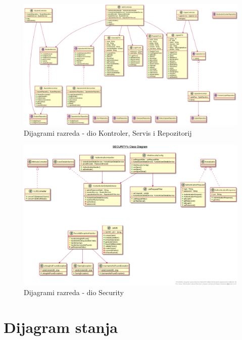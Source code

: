 			\begin{figure}[H]
				\includegraphics[scale=0.4]{dijagrami/controller.png} %
				\centering
				\caption{Dijagrami razreda - dio Kontroler, Servis i Repozitorij}
				\label{fig:controller}
			\end{figure}
		
			\begin{figure}[H]
				\includegraphics[scale=0.4]{dijagrami/security.png} %
				\centering
				\caption{Dijagrami razreda - dio Security}
				\label{fig:security}
			\end{figure}
		
		\eject
		
		\section{Dijagram stanja}
		
